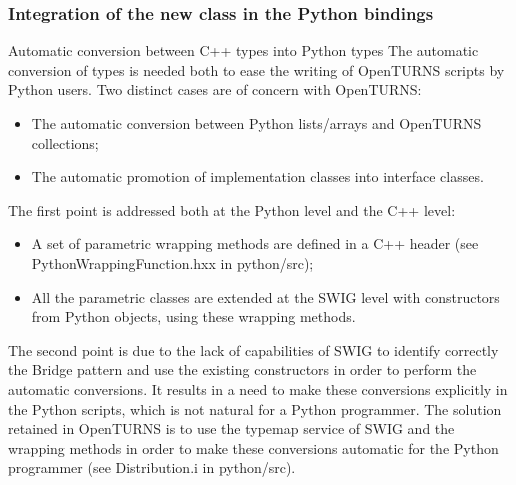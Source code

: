 \documentclass[8pt]{beamer}
\begin{document}
\begin{frame}
  \frametitle{Integration of the new class in the Python bindings}
  \begin{block}{Automatic conversion between C++ types into Python types}
    The automatic conversion of types is needed both to ease the writing of OpenTURNS scripts by Python users. Two distinct cases are of concern with OpenTURNS:
    \begin{itemize}
    \item The automatic conversion between Python lists/arrays and OpenTURNS collections;
    \item The automatic promotion of implementation classes into interface classes.
    \end{itemize}
    The first point is addressed both at the Python level and the C++ level:
    \begin{itemize}
    \item A set of parametric wrapping methods are defined in a C++ header (see PythonWrappingFunction.hxx in python/src);
    \item All the parametric classes are extended at the SWIG level with constructors from Python objects, using these wrapping methods.
    \end{itemize}
    The second point is due to the lack of capabilities of SWIG to identify correctly the Bridge pattern and use the existing constructors in order to perform the automatic conversions. It results in a need to make these conversions explicitly in the Python scripts, which is not natural for a Python programmer. The solution retained in OpenTURNS is to use the {\ttfamily typemap} service of SWIG and the wrapping methods in order to make these conversions automatic for the Python programmer (see Distribution.i in python/src).
  \end{block}
\end{frame}
\end{document}
